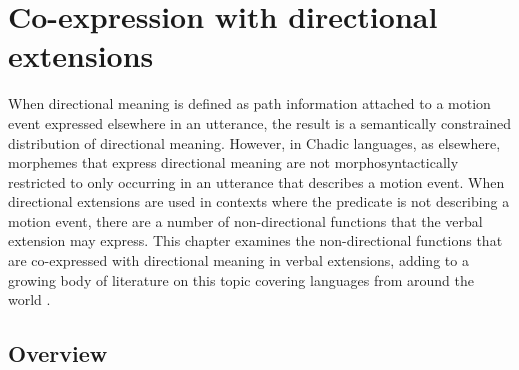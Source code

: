 \chapter{Co-expression with directional extensions} \label{ch:functions}

When directional meaning is defined as path information attached to a motion event expressed elsewhere in an utterance, the result is a semantically constrained distribution of directional meaning. However, in Chadic languages, as elsewhere, morphemes that express directional meaning are not morphosyntactically restricted to only occurring in an utterance that describes a motion event. When directional extensions are used in contexts where the predicate is not describing a motion event, there are a number of non-directional functions that the verbal extension may express. This chapter examines the non-directional functions that are co-expressed with directional meaning in verbal extensions, adding to a growing body of literature on this topic covering languages from around the world \citep{bourdinMarkingDirectionalDeixis2006,belkadiAssociatedMotionDeictic2015,belkadiDeicticDirectionalityAssociated2021,dimmendaalAlloyingEconomyPrinciple2018,dryerAssociatedMotionDirectionals2021,genettiDirectionAssociatedMotion2020,rossCrosslinguisticSurveyAssociated2021}. 


\section{Overview}


